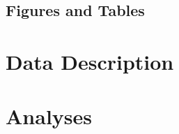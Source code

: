 \documentclass[a4paper,num-refs]{oup-contemporary}
\begin{document}
\subsection{Figures and Tables}




\section{Data Description}



\section{Analyses}
\end{document}
